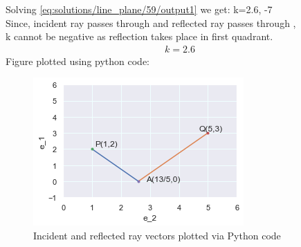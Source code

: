 Solving \eqref{eq:solutions/line_plane/59/output1} we get:
 k=2.6, -7 
 \\
 Since, incident ray passes through  and reflected ray passes through ,\\
 k cannot be negative as reflection takes place in first quadrant.
\begin{align}
   k=2.6
\end{align}
Figure plotted using python code:
\begin{figure}[h]
\centering
\includegraphics[width=\columnwidth]{./solutions/line_plane/59/output.png}
\caption{Incident and reflected ray vectors plotted via Python code}
\label{fig:solutions/line_plane/59/output1}
\end{figure}
